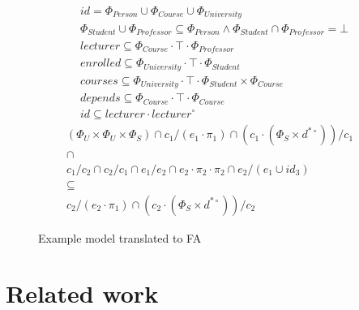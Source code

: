 \documentclass{llncs}
\begin{document}
\begin{figure}[t]
  \centering
\begin{align*}
&id = \Phi_{\mathit{Person}} \cup \Phi_{\mathit{Course}} \cup \Phi_{\mathit{University}}\\
&\Phi_{\mathit{Student}} \cup \Phi_{\mathit{Professor}} \subseteq \Phi_{\mathit{Person}} \wedge \Phi_{\mathit{Student}} \cap \Phi_{\mathit{Professor}} = \bot\\
&\mathit{lecturer} \subseteq \Phi_{\mathit{Course}} \cdot \top \cdot \Phi_{\mathit{Professor}}\\
&\mathit{enrolled} \subseteq \Phi_{\mathit{University}} \cdot \top \cdot \Phi_{\mathit{Student}}\\
&\mathit{courses} \subseteq \Phi_{\mathit{University}} \cdot \top \cdot \Phi_{\mathit{Student}} \times \Phi_{\mathit{Course}}\\
&\mathit{depends} \subseteq \Phi_{\mathit{Course}} \cdot \top \cdot \Phi_{\mathit{Course}}\\
&id \subseteq lecturer \cdot \mathit{lecturer}^\circ
\end{align*}  
\begin{displaymath}
  \begin{array}{c}
(\Phi_{\mathit{U}} \times \Phi_{\mathit{U}} \times \Phi_{\mathit{S}})
\cap \mathit{c}_1 / (\mathit{e}_1 \cdot \pi_1) \cap
(c_1 \cdot (\Phi_{\mathit{S}} \times d^{*\circ})) / c_1
\\ \cap \\ \mathit{c}_1 /
\mathit{c}_2 \cap \mathit{c}_2 / \mathit{c}_1 \cap
\mathit{e}_1 / \mathit{e}_2 \cap \mathit{e}_2 \cdot \pi_2 \cdot \pi_2
\cap \mathit{e}_2 / (\mathit{e}_1 \cup \mathit{id}_3)\\
\subseteq\\ 
 \mathit{c}_2 / (\mathit{e}_2 \cdot \pi_1)  \cap
(c_2 \cdot (\Phi_{\mathit{S}} \times d^{*\circ})) / c_2
\end{array}
\end{displaymath}
 \caption{Example model translated to FA}
  \label{fig:exfa}
\end{figure}

\section{Related work}
\label{sec:related}
\end{document}
